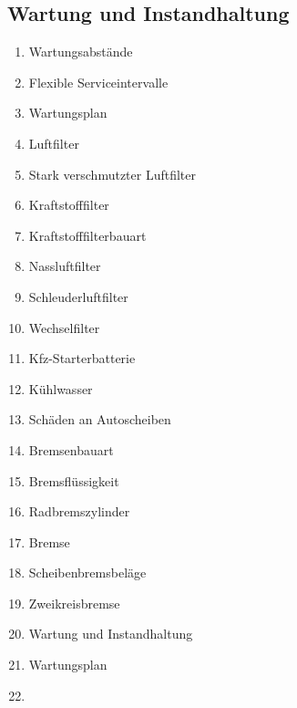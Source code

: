 \subsection{Wartung und
Instandhaltung}\label{wartung-und-instandhaltung}

\begin{enumerate}
\item
  Wartungsabstände\\
\item
  Flexible Serviceintervalle\\
\item
  Wartungsplan\\
\item
  Luftfilter\\
\item
  Stark verschmutzter Luftfilter\\
\item
  Kraftstofffilter\\
\item
  Kraftstofffilterbauart\\
\item
  Nassluftfilter\\
\item
  Schleuderluftfilter\\
\item
  Wechselfilter\\
\item
  Kfz-Starterbatterie\\
\item
  Kühlwasser\\
\item
  Schäden an Autoscheiben\\
\item
  Bremsenbauart\\
\item
  Bremsflüssigkeit\\
\item
  Radbremszylinder\\
\item
  Bremse\\
\item
  Scheibenbremsbeläge\\
\item
  Zweikreisbremse\\
\item
  Wartung und Instandhaltung\\
\item
  Wartungsplan\\
\item

\end{enumerate}
